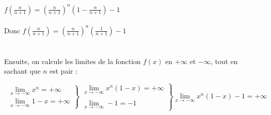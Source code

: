 \documentclass{article}
\begin{document}
\begin{exo2}
        $f(\frac{n}{n+1}) = (\frac{n}{n+1})^{n}(1-\frac{n}{n+1})-1$ \\ \\
        Donc $f(\frac{n}{n+1}) = (\frac{n}{n+1})^{n}(\frac{1}{n+1})-1$ \\ \\  \\    
        Ensuite, on calcule les limites de la fonction $f(x)$ en $+\infty$ et $-\infty$, tout en sachant que $n$ est pair :


    \[\
     \left.
        \begin{array}{ll}
            \lim\limits_{x \rightarrow -\infty} x^{n} = +\infty \\
            \lim\limits_{x \rightarrow -\infty} 1-x = +\infty
        \end{array}
    \right \} \left.
        \begin{array}{ll}
        \lim\limits_{x \rightarrow -\infty} x^{n}(1-x) = +\infty \\ \\
            \lim\limits_{x \rightarrow -\infty} -1 = -1 
        \end{array}
    \right \}\lim\limits_{x \rightarrow -\infty} x^{n}(1-x) -1 = +\infty
    \]
    
    \\ \\
    

\end{exo2}
\end{document}
